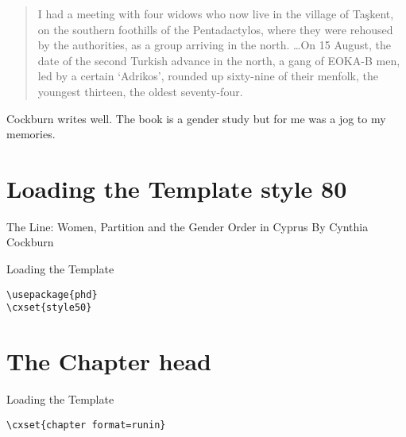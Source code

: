 \begin{quotation}
I had a meeting with four widows who now live in the village of Ta\c{s}kent, on the southern foothills of the Pentadactylos, where they were rehoused by the authorities, as a group arriving in the north. \ldots On 15 August, the date of the second Turkish advance in the north, a gang of \textsc{EOKA-B} men, led by a certain `Adrikos’, rounded up sixty-nine of their menfolk, the youngest thirteen, the oldest seventy-four. 
\end{quotation}

Cockburn writes well. The book is a gender study but for me was a jog to my memories. 

\section{Loading the Template style 80}
The Line: Women, Partition and the Gender Order in Cyprus
 By Cynthia Cockburn
\begin{scriptexample}{Loading the Template}
\begin{verbatim}
\usepackage{phd}
\cxset{style50}
\end{verbatim}
\end{scriptexample}

\section{The Chapter head}
\begin{scriptexample}{Loading the Template}{}
\begin{verbatim}
\cxset{chapter format=runin}
\end{verbatim}
\end{scriptexample}


\makeatletter\@runinheadfalse\makeatother


